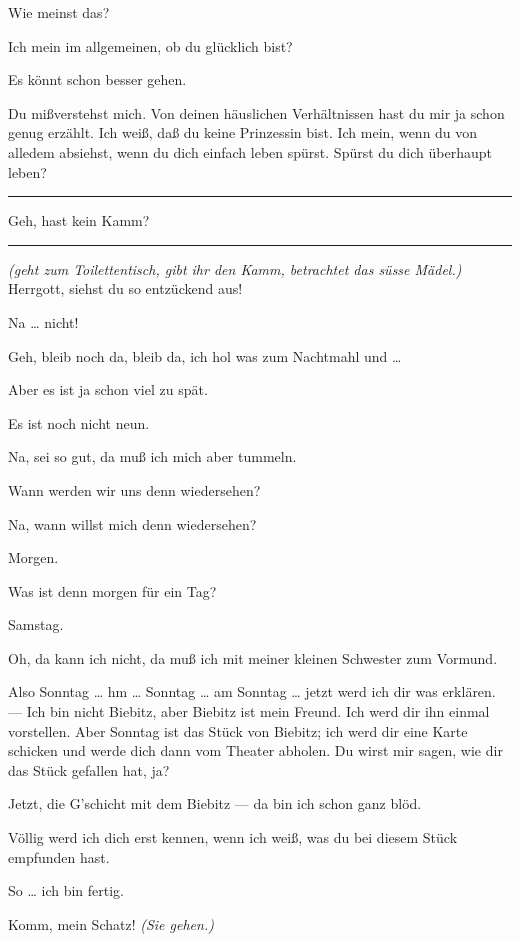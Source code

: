 \documentclass[
	final,
	a4paper,
	ngerman,
	mpinclude = true, %
	twoside = true,
	open = right,
	cleardoublepage = plain,
	DIV = 13,
	BCOR = 1cm,
	titlepage = firstiscover,
	]{scrbook}
\newcommand{\direction}[1]{\textit{(#1)}}
\newenvironment{deletion}{%
		\vspace{0.25\baselineskip}
		\hrule
		\vspace{0.25\baselineskip}
		\color{darkgray}
	}{
		\color{black}
		\vspace{0.25\baselineskip}
		\hrule 
		\vspace{0.25\baselineskip}
	}
\newcommand{\thecharacter}[1]{\textup{\textsc{#1}}\xspace}
\newcommand{\thesuesse}{\thecharacter{Lola}}
\newcommand{\thedichter}{\thecharacter{Robert Bibitz}}
\newcommand{\character}[1]{\item[#1:]}
\newcommand{\suesse}{\character{\thesuesse}}
\newcommand{\dichter}{\character{\thedichter}}
\begin{document}
\begin{play}
	\suesse
	Wie meinst das?

	\dichter
	Ich mein im allgemeinen, ob du glücklich bist?

	\suesse
	Es könnt schon besser gehen.

	\dichter
	Du mißverstehst mich. Von deinen häuslichen Verhältnissen hast du mir ja schon genug erzählt. Ich weiß, daß du keine Prinzessin bist. Ich mein, wenn du von alledem absiehst, wenn du dich einfach leben spürst. Spürst du dich überhaupt leben?

	\begin{deletion}
	\suesse
	Geh, hast kein Kamm?

	\dichter
	\end{deletion}
	\direction{geht zum Toilettentisch, gibt ihr den Kamm, betrachtet das süsse Mädel.} Herrgott, siehst du so entzückend aus!

	\suesse
	Na \ldots{} nicht!

	\dichter
	Geh, bleib noch da, bleib da, ich hol was zum Nachtmahl und \ldots{}

	\suesse
	Aber es ist ja schon viel zu spät.

	\dichter
	Es ist noch nicht neun.

	\suesse
	Na, sei so gut, da muß ich mich aber tummeln.

	\dichter
	Wann werden wir uns denn wiedersehen?

	\suesse
	Na, wann willst mich denn wiedersehen?

	\dichter
	Morgen.

	\suesse
	Was ist denn morgen für ein Tag?

	\dichter
	Samstag.

	\suesse
	Oh, da kann ich nicht, da muß ich mit meiner kleinen Schwester zum Vormund.

	\dichter
	Also Sonntag \ldots{} hm \ldots{} Sonntag \ldots{} am Sonntag \ldots{} jetzt werd ich dir was erklären. --- Ich bin nicht Biebitz, aber Biebitz ist mein Freund. Ich werd dir ihn einmal vorstellen. Aber Sonntag ist das Stück von Biebitz; ich werd dir eine Karte schicken und werde dich dann vom Theater abholen. Du wirst mir sagen, wie dir das Stück gefallen hat, ja?

	\suesse
	Jetzt, die G'schicht mit dem Biebitz --- da bin ich schon ganz blöd.

	\dichter
	Völlig werd ich dich erst kennen, wenn ich weiß, was du bei diesem Stück empfunden hast.

	\suesse
	So \ldots{} ich bin fertig.

	\dichter
	Komm, mein Schatz! \direction{Sie gehen.}

\end{play}
\end{document}
